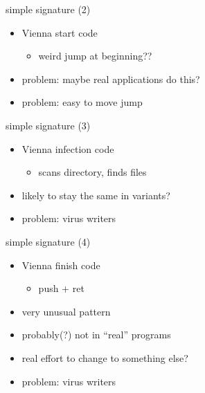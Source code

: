 \begin{frame}{simple signature (2)}
    \begin{itemize}
    \item Vienna start code
        \begin{itemize}
        \item weird jump at beginning??
        \end{itemize}
    \item problem: maybe real applications do this?
    \item problem: easy to move jump
    \end{itemize}
\end{frame}

\begin{frame}{simple signature (3)}
    \begin{itemize}
    \item Vienna infection code
        \begin{itemize}
        \item scans directory, finds files
        \end{itemize}
    \item likely to stay the same in variants?
    \item<2> problem: virus writers 
    \end{itemize}
\end{frame}

\begin{frame}{simple signature (4)}
    \begin{itemize}
    \item Vienna finish code
        \begin{itemize}
        \item push + ret 
        \end{itemize}
    \item very unusual pattern
    \item probably(?) not in ``real'' programs
    \item real effort to change to something else?
    \item<2> problem: virus writers 
    \end{itemize}
\end{frame}


